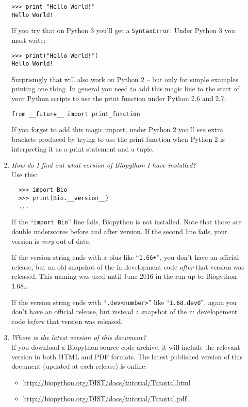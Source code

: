 \begin{enumerate}
\begin{verbatim}
>>> print "Hello World!"
Hello World!
\end{verbatim}

  If you try that on Python 3 you'll get a \verb|SyntaxError|.
  Under Python 3 you must write:

\begin{verbatim}
>>> print("Hello World!")
Hello World!
\end{verbatim}

  Surprisingly that will also work on Python 2 -- but only for simple
  examples printing one thing. In general you need to add this magic
  line to the start of your Python scripts to use the print function
  under Python 2.6 and 2.7:

\begin{verbatim}
from __future__ import print_function
\end{verbatim}

  If you forget to add this magic import, under Python 2 you'll see
  extra brackets produced by trying to use the print function when
  Python 2 is interpreting it as a print statement and a tuple.

  \item \emph{How do I find out what version of Biopython I have installed?} \\
  Use this:
  \begin{verbatim}
  >>> import Bio
  >>> print(Bio.__version__)
  ...
  \end{verbatim}
  If the ``\verb|import Bio|'' line fails, Biopython is not installed.
  Note that those are double underscores before and after version.
  If the second line fails, your version is \emph{very} out of date.

  If the version string ends with a plus like ``\verb|1.66+|'', you
  don't have an official release, but an old snapshot of the in
  development code \emph{after} that version was released. This naming
  was used until June 2016 in the run-up to Biopython 1.68..

  If the version string ends with ``\verb|.dev<number>|'' like
  ``\verb|1.68.dev0|'', again you don't have an official release,
  but instead a snapshot of the in developement code \emph{before}
  that version was released.

  \item \emph{Where is the latest version of this document?}\\
  If you download a Biopython source code archive, it will include the
  relevant version in both HTML and PDF formats.  The latest published
  version of this document (updated at each release) is online:
  \begin{itemize}
  \item \url{http://biopython.org/DIST/docs/tutorial/Tutorial.html}
  \item \url{http://biopython.org/DIST/docs/tutorial/Tutorial.pdf}
  \end{itemize}


\end{enumerate}
